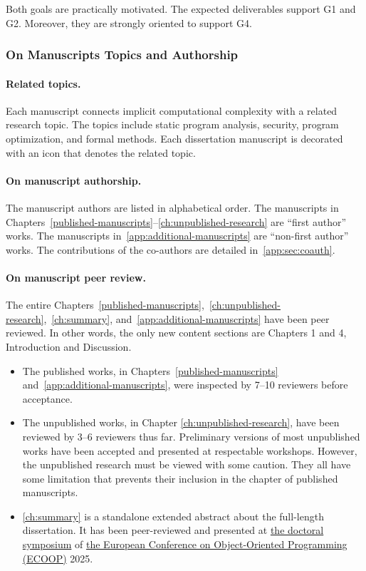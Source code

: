 Both goals are practically motivated. The expected deliverables support G1 and
G2. Moreover, they are strongly oriented to support G4.

\subsubsection{On Manuscripts Topics and Authorship}


\paragraph*{Related topics.}
Each manuscript connects implicit computational complexity with a related research topic.
The topics include static program analysis, security, program optimization, and formal methods.
Each dissertation manuscript is decorated with an icon that denotes the related topic.

\paragraph*{On manuscript authorship.}
The manuscript authors are listed in alphabetical order.
The manuscripts in Chapters~\ref{published-manuscripts}--\ref{ch:unpublished-research} are \enquote{first author} works.
The manuscripts in~\autoref{app:additional-manuscripts} are \enquote{non-first author} works.
The contributions of the co-authors are detailed in~\autoref{app:sec:coauth}.

\paragraph*{On manuscript peer review.}
The entire Chapters~\ref{published-manuscripts},~\ref{ch:unpublished-research},~\ref{ch:summary}, and~\ref{app:additional-manuscripts} have been peer reviewed.
In other words, the only new content sections are Chapters 1 and 4, Introduction and Discussion.

\begin{itemize}

\item The published works, in Chapters~\ref{published-manuscripts} and~\ref{app:additional-manuscripts}, were inspected by 7--10 reviewers before acceptance.

\item The unpublished works, in Chapter \ref{ch:unpublished-research}, have been reviewed by 3--6 reviewers thus far.
Preliminary versions of most unpublished works have been accepted and presented at respectable workshops.
However, the unpublished research must be viewed with some caution.
They all have some limitation that prevents their inclusion in the chapter of published manuscripts.

\item \autoref{ch:summary} is a standalone extended abstract about the full-length dissertation.
It has been peer-reviewed and presented at \href{https://2025.ecoop.org/track/ecoop-2025-doctoral-symposium}{the doctoral symposium} of \href{https://2025.ecoop.org}{the European Conference on Object-Oriented Programming (ECOOP)} 2025.

\end{itemize}

